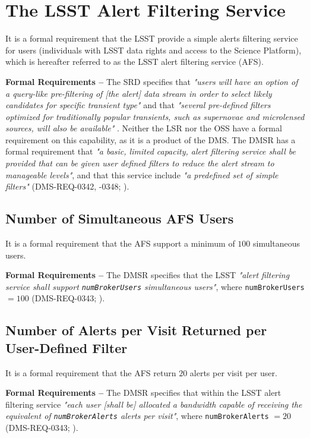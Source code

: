\documentclass[DM,authoryear,toc]{lsstdoc}
\begin{document}
\section{The LSST Alert Filtering Service} \label{sec:LAFS}

It is a formal requirement that the LSST provide a simple alerts filtering service for users (individuals with LSST data rights and access to the Science Platform), which is hereafter referred to as the LSST alert filtering service (AFS).

{\bf Formal Requirements --} The SRD specifies that {\it "users will have an option of a query-like pre-filtering of [the alert] data stream in order to select likely candidates for specific transient type"} and that {\it "several pre-defined filters optimized for traditionally popular transients, such as supernovae and microlensed sources, will also be available"} . Neither the LSR nor the OSS have a formal requirement on this capability, as it is a product of the DMS. The DMSR has a formal requirement that {\it "a basic, limited capacity, alert filtering service shall be provided that can be given user defined filters to reduce the alert stream to manageable levels"}, and that this service include {\it "a predefined set of simple filters"} (DMS-REQ-0342, -0348; ). 


\subsection{Number of Simultaneous AFS Users}\label{ssec:AFS_users}

It is a formal requirement that the AFS support a minimum of $100$ simultaneous users.

{\bf Formal Requirements --} The DMSR specifies that the LSST {\it "alert filtering service shall support {\tt numBrokerUsers} simultaneous users"}, where {\tt numBrokerUsers} $=100$ (DMS-REQ-0343; ).


\subsection{Number of Alerts per Visit Returned per User-Defined Filter}\label{ssec:AFS_returns}

It is a formal requirement that the AFS return $20$ alerts per visit per user.

{\bf Formal Requirements --} The DMSR specifies that within the LSST alert filtering service {\it "each user [shall be] allocated a bandwidth capable of receiving the equivalent of {\tt numBrokerAlerts} alerts per visit"}, where {\tt numBrokerAlerts} $=20$ (DMS-REQ-0343; ).
\end{document}
